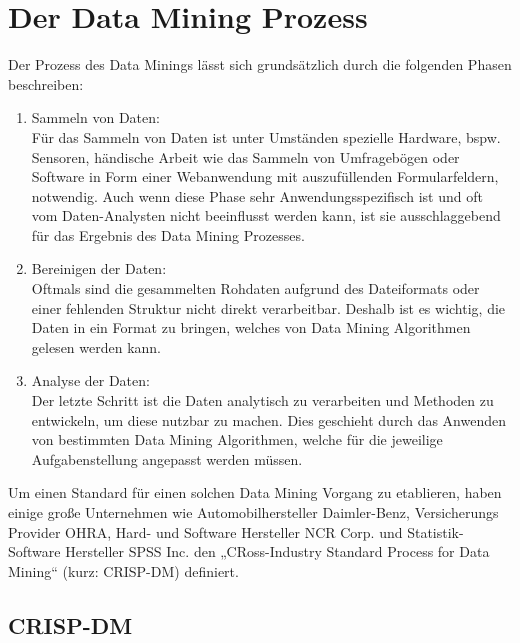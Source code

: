 %


%
%
\chapter{Der Data Mining Prozess}
\label{sec:process}

Der Prozess des Data Minings lässt sich grundsätzlich durch die folgenden Phasen
beschreiben:
\begin{enumerate}
\item Sammeln von Daten: \\
Für das Sammeln von Daten ist unter Umständen spezielle Hardware, bspw.
Sensoren, händische Arbeit wie das Sammeln von Umfragebögen oder Software in
Form einer Webanwendung mit auszufüllenden Formularfeldern, notwendig. Auch wenn
diese Phase sehr Anwendungsspezifisch ist und oft vom Daten-Analysten nicht
beeinflusst werden kann, ist sie ausschlaggebend für das Ergebnis des Data
Mining Prozesses.
\item Bereinigen der Daten: \\
Oftmals sind die gesammelten Rohdaten aufgrund des Dateiformats oder einer
fehlenden Struktur nicht direkt verarbeitbar. Deshalb ist es wichtig, die Daten
in ein Format zu bringen, welches von Data Mining Algorithmen gelesen werden
kann.
\item Analyse der Daten: \\
Der letzte Schritt ist die Daten analytisch zu verarbeiten und Methoden zu
entwickeln, um diese nutzbar zu machen. Dies geschieht durch das Anwenden von
bestimmten Data Mining Algorithmen, welche für die jeweilige Aufgabenstellung
angepasst werden müssen.
\end{enumerate}
Um einen Standard für einen solchen Data Mining Vorgang zu etablieren, haben
einige große Unternehmen wie Automobilhersteller Daimler-Benz, Versicherungs
Provider OHRA, Hard- und Software Hersteller NCR Corp. und Statistik-Software
Hersteller SPSS Inc. den „CRoss-Industry Standard Process for Data Mining“
(kurz: CRISP-DM) definiert.

\pagebreak

\section{CRISP-DM}
\label{sec:process:crispdm}

